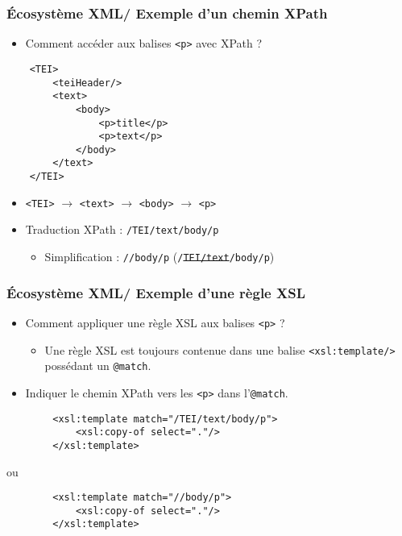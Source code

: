 \documentclass{beamer}
\begin{document}
\begin{frame}[fragile]
\frametitle{Écosystème XML/ Exemple d'un chemin XPath}
\begin{itemize}
    \item Comment accéder aux balises \texttt{<p>} avec XPath ?
\end{itemize}
\small
\begin{verbatim}
    <TEI>
        <teiHeader/>
        <text>
            <body>
                <p>title</p>
                <p>text</p>
            </body>
        </text>
    </TEI>
\end{verbatim}
\normalsize
\begin{itemize}
          \item \texttt{<TEI>} $\rightarrow$ \texttt{<text>} $\rightarrow$ \texttt{<body>} $\rightarrow$ \texttt{<p>}
          \item Traduction XPath : \texttt{/TEI/text/body/p}
          \begin{itemize}
              \item Simplification : \texttt{//body/p} (\texttt{/\sout{TEI/text}/body/p})
          \end{itemize}
      \end{itemize}
\end{frame}
  
    \begin{frame}[fragile]
   \frametitle{Écosystème XML/ Exemple d'une règle XSL}
        \begin{itemize}
            \item Comment appliquer une règle XSL aux balises \texttt{<p>} ?
            \begin{itemize}
                \item Une règle XSL est toujours contenue dans une balise \texttt{<xsl:template/>} possédant un \texttt{@match}.
            \end{itemize}
            \item Indiquer le chemin XPath vers les \texttt{<p>} dans  l'\texttt{@match}.
        \end{itemize}
        \bigskip
        \begin{verbatim}
        <xsl:template match="/TEI/text/body/p">
            <xsl:copy-of select="."/>
        </xsl:template>
        \end{verbatim}
        ou
        \begin{verbatim}
        <xsl:template match="//body/p">
            <xsl:copy-of select="."/>
        </xsl:template>
        \end{verbatim}
   \end{frame}
\end{document}
